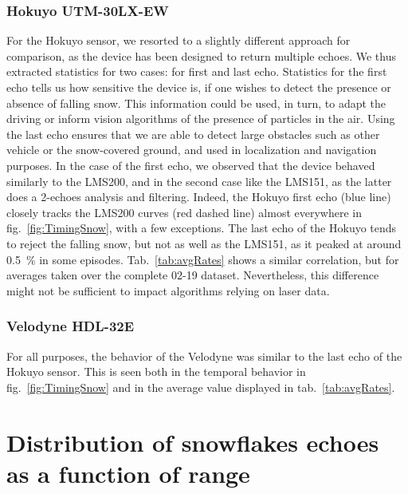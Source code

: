 \subsubsection{Hokuyo UTM-30LX-EW}
For the Hokuyo sensor, we resorted to a slightly different approach for comparison, as the device has been designed to return multiple echoes. We thus extracted statistics for two cases: for first and last echo. Statistics for the first echo tells us how sensitive the device is, if one wishes to detect the presence or absence of falling snow. This information could be used, in turn, to adapt the driving or inform vision algorithms of the presence of particles in the air. Using the last echo ensures that we are able to detect large obstacles such as other vehicle or the snow-covered ground, and used in localization and navigation purposes. In the case of the first echo, we observed that the device behaved similarly to the LMS200, and in the second case like the LMS151, as the latter does a 2-echoes analysis and filtering. Indeed, the Hokuyo first echo (blue line) closely tracks the LMS200 curves (red dashed line) almost everywhere in fig.~\ref{fig:TimingSnow}, with a few exceptions. The last echo of the Hokuyo tends to reject the falling snow, but not as well as the LMS151, as it peaked at around 0.5~\% in some episodes. Tab.~\ref{tab:avgRates} shows a similar correlation, but for averages taken over the complete 02-19 dataset. Nevertheless, this difference might not be sufficient to impact algorithms relying on laser data.

\subsubsection{Velodyne HDL-32E}
For all purposes, the behavior of the Velodyne was similar to the last echo of the Hokuyo sensor. This is seen both in the temporal behavior in fig.~\ref{fig:TimingSnow} and in the average value displayed in tab.~\ref{tab:avgRates}.

\section{Distribution of snowflakes echoes as a function of range}
\label{sec:Histo}

